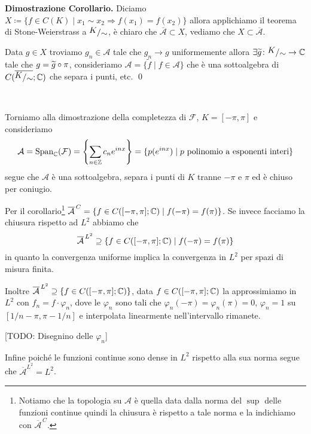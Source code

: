 \begin{enumerate}
\begin{minipage}{\textwidth - 2.5em}
		\textbf{Dimostrazione Corollario.}
		Diciamo $X \coloneqq \{ f \in C(K) \mid x_1 \sim x_2 \Rightarrow f(x_1) = f(x_2) \}$ allora applichiamo	il teorema di Stone-Weierstrass a $\sfrac{K}{\sim}$, è chiaro che $\overline{\mathcal A} \subset X$, vediamo che $X \subset \overline{\mathcal A}$. 

		Data $g \in X$ troviamo $g_n \in \mathcal A$ tale che $g_n \to g$ uniformemente allora $\exists \tilde g \colon \sfrac{K}{\sim} \to \C$ tale che $g = \widetilde g \circ \pi$, consideriamo $\mathcal A = \{ \tilde f \mid f \in \mathcal A \}$ che è una sottoalgebra di $C(\overline{\sfrac{K}{\sim}}; \C)$ che separa i punti, etc. 
		\qed
		\end{minipage}

		\ 

		Torniamo alla dimostrazione della completezza di $\mathcal F$, $K = [-\pi, \pi]$ e consideriamo
		$$
		\mathcal A = \operatorname{Span}_\mathbb C(\mathcal F) = \left\{ \sum_{n \in \mathbb Z} c_n e^{inx} \right\} = \{ p(e^{inx}) \mid p \text{ polinomio a esponenti interi} \}
		$$
		segue che $\mathcal A$ è una sottoalgebra, separa i punti di $K$ tranne $-\pi$ e $\pi$ ed è chiuso per coniugio.

		Per il corollario\footnote{Notiamo che la topologia su $\mathcal A$ è quella data dalla norma del $\sup$ delle funzioni continue quindi la chiusura è rispetto a tale norma e la indichiamo con $\overline{\mathcal A}^{\,C}$.} $\overline{\mathcal A}^{\,C} = \{ f \in C([-\pi, \pi]; \mathbb C) \mid f(-\pi) = f(\pi) \}$. Se invece facciamo la chiusura rispetto ad $L^2$ abbiamo che 
		$$
		\overline{\mathcal A}^{\,L^2} \supseteq \{ f \in C([-\pi, \pi]; \mathbb C) \mid f(-\pi) = f(\pi) \}
		$$
		in quanto la convergenza uniforme implica la convergenza in $L^2$ per spazi di misura finita.

		Inoltre $\overline{\mathcal A}^{\,L^2} \supseteq \{ f \in C([-\pi, \pi]; \mathbb C) \}$, data $f \in C([-\pi, \pi]; \mathbb C)$ la approssimiamo in $L^2$ con $f_n = f \cdot \varphi_n$, dove le $\varphi_n$ sono tali che $\varphi_n(-\pi) = \varphi_n(\pi) = 0$, $\varphi_n = 1$ su $[1/n - \pi, \pi - 1/n]$ e interpolata linearmente nell'intervallo rimanete.

		[TODO: Disegnino delle $\varphi_n$]

		Infine poiché le funzioni continue sono dense in $L^2$ rispetto alla sua norma segue che $\overline{\mathcal A}^{L^2} = L^2$.

\end{enumerate}

